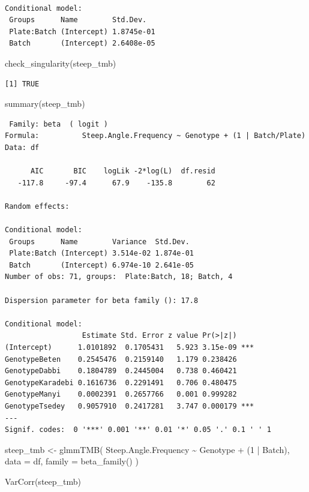 \documentclass[
  letterpaper,
  DIV=11,
  numbers=noendperiod]{scrartcl}
\newenvironment{Shaded}{\begin{snugshade}}{\end{snugshade}}
\newcommand{\AttributeTok}[1]{\textcolor[rgb]{0.40,0.45,0.13}{#1}}
\newcommand{\DecValTok}[1]{\textcolor[rgb]{0.68,0.00,0.00}{#1}}
\newcommand{\FunctionTok}[1]{\textcolor[rgb]{0.28,0.35,0.67}{#1}}
\newcommand{\NormalTok}[1]{\textcolor[rgb]{0.00,0.23,0.31}{#1}}
\newcommand{\OtherTok}[1]{\textcolor[rgb]{0.00,0.23,0.31}{#1}}
\newcommand{\SpecialCharTok}[1]{\textcolor[rgb]{0.37,0.37,0.37}{#1}}
\begin{document}
\begin{verbatim}

Conditional model:
 Groups      Name        Std.Dev.  
 Plate:Batch (Intercept) 1.8745e-01
 Batch       (Intercept) 2.6408e-05
\end{verbatim}

\begin{Shaded}
\begin{Highlighting}[]
\FunctionTok{check\_singularity}\NormalTok{(steep\_tmb)}
\end{Highlighting}
\end{Shaded}

\begin{verbatim}
[1] TRUE
\end{verbatim}

\begin{Shaded}
\begin{Highlighting}[]
\FunctionTok{summary}\NormalTok{(steep\_tmb)}
\end{Highlighting}
\end{Shaded}

\begin{verbatim}
 Family: beta  ( logit )
Formula:          Steep.Angle.Frequency ~ Genotype + (1 | Batch/Plate)
Data: df

      AIC       BIC    logLik -2*log(L)  df.resid 
   -117.8     -97.4      67.9    -135.8        62 

Random effects:

Conditional model:
 Groups      Name        Variance  Std.Dev. 
 Plate:Batch (Intercept) 3.514e-02 1.874e-01
 Batch       (Intercept) 6.974e-10 2.641e-05
Number of obs: 71, groups:  Plate:Batch, 18; Batch, 4

Dispersion parameter for beta family (): 17.8 

Conditional model:
                  Estimate Std. Error z value Pr(>|z|)    
(Intercept)      1.0101892  0.1705431   5.923 3.15e-09 ***
GenotypeBeten    0.2545476  0.2159140   1.179 0.238426    
GenotypeDabbi    0.1804789  0.2445004   0.738 0.460421    
GenotypeKaradebi 0.1616736  0.2291491   0.706 0.480475    
GenotypeManyi    0.0002391  0.2657766   0.001 0.999282    
GenotypeTsedey   0.9057910  0.2417281   3.747 0.000179 ***
---
Signif. codes:  0 '***' 0.001 '**' 0.01 '*' 0.05 '.' 0.1 ' ' 1
\end{verbatim}

\begin{Shaded}
\begin{Highlighting}[]
\NormalTok{steep\_tmb }\OtherTok{\textless{}{-}} \FunctionTok{glmmTMB}\NormalTok{(}
\NormalTok{  Steep.Angle.Frequency }\SpecialCharTok{\textasciitilde{}}\NormalTok{ Genotype }\SpecialCharTok{+}\NormalTok{ (}\DecValTok{1} \SpecialCharTok{|}\NormalTok{ Batch),}
  \AttributeTok{data =}\NormalTok{ df, }\AttributeTok{family =} \FunctionTok{beta\_family}\NormalTok{()}
\NormalTok{)}

\FunctionTok{VarCorr}\NormalTok{(steep\_tmb)}
\end{Highlighting}
\end{Shaded}
\end{document}

